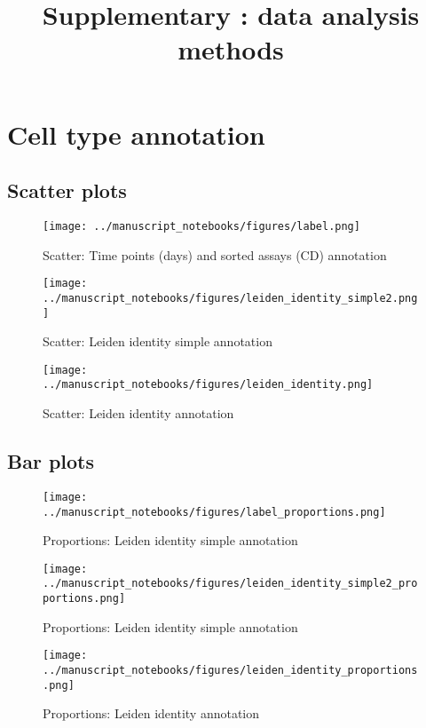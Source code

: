 \documentclass[a4paper]{article}
\begin{document}
\title{Supplementary : data analysis methods}

\tableofcontents

\section{Cell type annotation}

\subsection{Scatter plots}

\begin{figure}[!htb]
  \centering
  \texttt{[image: ../manuscript\_notebooks/figures/label.png]}
  \caption{Scatter: Time points (days) and sorted assays (CD) annotation}
\end{figure}

\begin{figure}[!htb]
  \centering
  \texttt{[image: ../manuscript\_notebooks/figures/leiden\_identity\_simple2.png]}
  \caption{Scatter: Leiden identity simple annotation}
\end{figure}

\begin{figure}[!htb]
  \centering
  \texttt{[image: ../manuscript\_notebooks/figures/leiden\_identity.png]}
  \caption{Scatter: Leiden identity annotation}
\end{figure}

\FloatBarrier
\subsection{Bar plots}

\begin{figure}[!htb]
  \centering
  \texttt{[image: ../manuscript\_notebooks/figures/label\_proportions.png]}
  \caption{Proportions: Leiden identity simple annotation}
\end{figure}

\begin{figure}[!htb]
  \centering
  \texttt{[image: ../manuscript\_notebooks/figures/leiden\_identity\_simple2\_proportions.png]}
  \caption{Proportions: Leiden identity simple annotation}
\end{figure}

\begin{figure}[!htb]
  \centering
  \texttt{[image: ../manuscript\_notebooks/figures/leiden\_identity\_proportions.png]}
  \caption{Proportions: Leiden identity annotation}
\end{figure}
\end{document}
